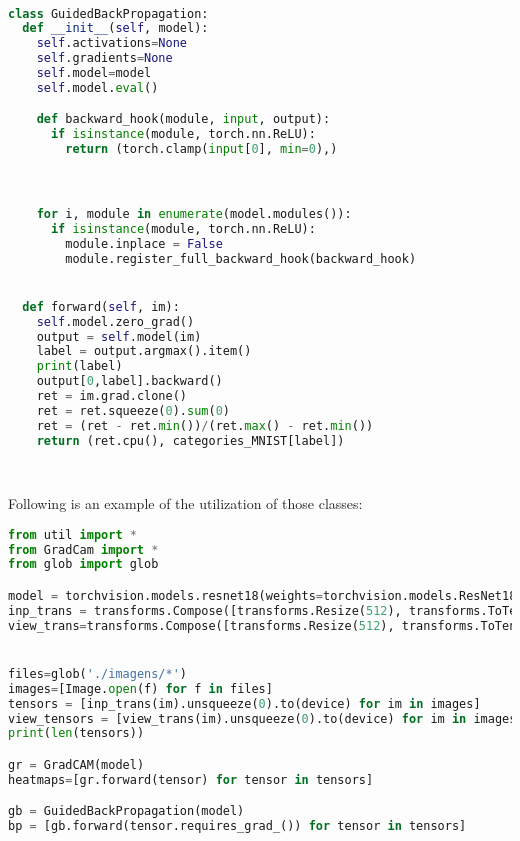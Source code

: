 \begin{program}[H]
    \centering
    \label{code:gbp_class}
    \begin{lstlisting}[language=Python, style=wider]
        

class GuidedBackPropagation:
  def __init__(self, model):
    self.activations=None
    self.gradients=None
    self.model=model
    self.model.eval()

    def backward_hook(module, input, output):
      if isinstance(module, torch.nn.ReLU):
        return (torch.clamp(input[0], min=0),)



    for i, module in enumerate(model.modules()):
      if isinstance(module, torch.nn.ReLU):
        module.inplace = False
        module.register_full_backward_hook(backward_hook)


  def forward(self, im):
    self.model.zero_grad()
    output = self.model(im)
    label = output.argmax().item()
    print(label)
    output[0,label].backward()
    ret = im.grad.clone()
    ret = ret.squeeze(0).sum(0)
    ret = (ret - ret.min())/(ret.max() - ret.min())
    return (ret.cpu(), categories_MNIST[label])

    
    \end{lstlisting}

    \caption{GradCAM Class}

    
\end{program}

Following is an example of the utilization of those classes:

\begin{program}[H]
    \centering
    \label{code:using_gc_gbp}
    \begin{lstlisting}[language=Python, style=wider]
from util import *
from GradCam import *
from glob import glob

model = torchvision.models.resnet18(weights=torchvision.models.ResNet18_Weights.IMAGENET1K_V1).to(device).eval()
inp_trans = transforms.Compose([transforms.Resize(512), transforms.ToTensor(), transforms.Normalize(mean=[0.485, 0.456, 0.406], std=[0.229, 0.224, 0.225]),])
view_trans=transforms.Compose([transforms.Resize(512), transforms.ToTensor()])


files=glob('./imagens/*')
images=[Image.open(f) for f in files]
tensors = [inp_trans(im).unsqueeze(0).to(device) for im in images]
view_tensors = [view_trans(im).unsqueeze(0).to(device) for im in images]
print(len(tensors))

gr = GradCAM(model)
heatmaps=[gr.forward(tensor) for tensor in tensors]

gb = GuidedBackPropagation(model)
bp = [gb.forward(tensor.requires_grad_()) for tensor in tensors]

      
    \end{lstlisting}

    \caption{Utilization of the classes}
   

\end{program}

